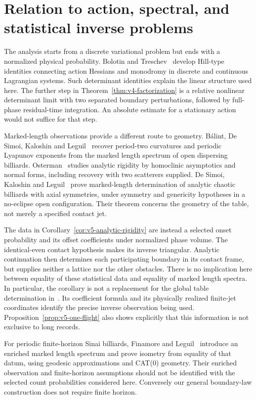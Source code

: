 \section{Relation to action, spectral, and statistical inverse problems}
\label{sec:v5-comparison}
The analysis starts from a discrete variational problem but ends with a
normalized physical probability. Bolotin and Treschev~\cite{Hill} develop
Hill-type identities connecting action Hessians and monodromy in discrete
and continuous Lagrangian systems. Such determinant identities explain
the linear structure used here. The further step in
Theorem~\ref{thm:v4-factorization} is a relative nonlinear determinant
limit with two separated boundary perturbations, followed by full-phase
residual-time integration. An absolute estimate for a stationary action
would not suffice for that step.

Marked-length observations provide a different route to geometry.
B\'alint, De Simoi, Kaloshin and Leguil~\cite{BDKL} recover period-two
curvatures and periodic Lyapunov exponents from the marked length
spectrum of open dispersing billiards. Osterman~\cite{Osterman} studies
analytic rigidity by homoclinic asymptotics and normal forms, including
recovery with two scatterers supplied. De Simoi, Kaloshin and
Leguil~\cite{DSKL} prove marked-length determination of analytic chaotic
billiards with axial symmetries, under symmetry and genericity hypotheses
in a no-eclipse open configuration. Their theorem concerns the geometry
of the table, not merely a specified contact jet.

The data in Corollary~\ref{cor:v5-analytic-rigidity} are instead a selected
onset probability and its offset coefficients under normalized phase
volume. The identical-even contact hypothesis makes its inverse
triangular. Analytic continuation then determines each participating
boundary in its contact frame, but supplies neither a lattice nor the
other obstacles. There is no implication here between equality of these
statistical data and equality of marked length spectra. In particular,
the corollary is not a replacement for the global table determination
in~\cite{DSKL}. Its coefficient formula and its physically realized
finite-jet coordinates identify the precise inverse observation being
used. Proposition~\ref{prop:v5-one-flight} also shows explicitly that
this information is not exclusive to long records.

For periodic finite-horizon Sinai billiards, Finamore and
Leguil~\cite{FinamoreLeguil} introduce an enriched marked length spectrum
and prove isometry from equality of that datum, using geodesic
approximations and CAT(0) geometry. Their enriched observation and
finite-horizon assumptions should not be identified with the selected
count probabilities considered here. Conversely our general boundary-law
construction does not require finite horizon.

